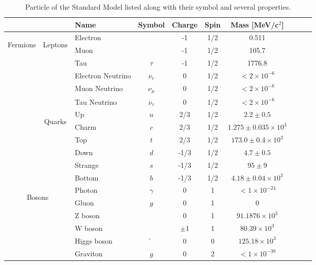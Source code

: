 \begin{table}[htp]
\begin{center}
\caption{Particle of the Standard Model listed along with their symbol and several properties.}
{\footnotesize
\begin{tabular}{c c l c c c c c c c}
\toprule
& & Name & Symbol & Charge & Spin & Mass [MeV/c$^2$] \\
\midrule
\multirow{12}{*}[0em]{\begin{sideways}Fermions\end{sideways}} & \multirow{6}{*}[0em]{\begin{sideways}Leptons\end{sideways}} & Electron & \e & -1 & 1/2 & 0.511 \\
& & Muon   			  & \m         & -1 & 1/2 & 105.7 \\
& & Tau    			  & $\tau$     & -1 & 1/2 & 1776.8 \\
& & Electron Neutrino & $\nu_e$    & 0  & 1/2 &  $<2\times10^{-6}$\\
& & Muon Neutrino     & $\nu_\mu$  & 0  & 1/2 &  $<2\times10^{-6}$\\
& & Tau Neutrino      & $\nu_\tau$ & 0  & 1/2 &  $<2\times10^{-6}$\\
\cline{2-7}
& \multirow{6}{*}[0em]{\begin{sideways}Quarks\end{sideways}} & Up & $u$ & 2/3 & 1/2 &  $2.2\pm0.5$ \\
& & Charm             & $c$ &  2/3 & 1/2 &  $1.275\pm0.035\times10^{3}$ \\
& & Top               & $t$ &  2/3 & 1/2 &  $173.0\pm0.4\times10^{3}$ \\
& & Down              & $d$ & -1/3 & 1/2 &  $4.7\pm0.5$ \\
& & Strange           & $s$ & -1/3 & 1/2 &  $95\pm9$ \\
& & Bottom            & $b$ & -1/3 & 1/2 &  $4.18\pm0.04\times10^{3}$ \\
\midrule
\multicolumn{2}{c}{\multirow{6}{*}[0em]{\begin{sideways}Bosons\end{sideways}}} & Photon & $\gamma$ & 0 & 1 & $<1\times10^{-24}$ \\
& & Gluon         & $g$ & 0 & 1 & 0 \\
& & Z boson       & \Z  & 0 & 1 & $91.1876\times 10^3$ \\
& & W boson       & \W  & $\pm$1 & 1 & $80.39\times 10^3$ \\
& & Higgs boson   & \h  & 0 & 0 & $125.18\times 10^3$ \\
& & Graviton      & $g$ & 0 & 2 & $<1\times 10^{-38}$ \\
\bottomrule
\end{tabular}
}
\label{tab:particles}
\end{center}
\end{table}

